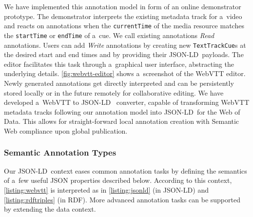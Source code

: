 \documentclass[runningheads,a4paper]{llncs}
\def\JSONLD{\mbox{JSON-LD}}
\def\JSONLD{\mbox{JSON-LD}}
\begin{document}
We have implemented this annotation model
in form of an online demonstrator prototype.
The demonstrator interprets the existing metadata track for a~video
and reacts on annotations when the \texttt{currentTime}
of the media resource matches the
\texttt{startTime} or \texttt{endTime} of a~cue.
We call existing annotations \emph{Read} annotations.
Users can add \emph{Write} annotations
by creating new \texttt{TextTrackCue}s
at the desired start and end times
and by providing their \JSONLD~payloads.
The editor facilitates this task through a~graphical user interface, abstracting the underlying details.
\autoref{fig:webvtt-editor} shows a~screenshot of the WebVTT editor.
Newly generated annotations get directly interpreted
and can be persistently stored locally
or in the future remotely for collaborative editing.
We have developed a~WebVTT to \JSONLD~%
converter, capable of transforming WebVTT metadata tracks
following our annotation model
into \JSONLD~for the Web of Data.
This allows for straight-forward local annotation creation
with Semantic Web compliance upon global publication.

\subsubsection{Semantic Annotation Types}

Our \JSONLD\ context eases common annotation tasks
by defining the semantics of a~few useful JSON properties described below.
According to this context, \autoref{listing:webvtt} is interpreted as in
\autoref{listing:jsonld} (in \JSONLD) and \autoref{listing:rdftriples} (in RDF).
More advanced annotation tasks can be supported by extending the data context.
\end{document}
